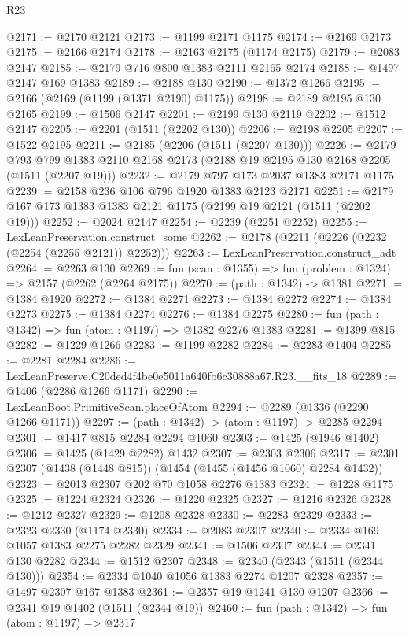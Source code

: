 \begin{lexlean}{R23}
\begin{coremodule}
@2171 := @2170 @2121
@2173 := @1199 @2171 @1175
@2174 := @2169 @2173
@2175 := @2166 @2174
@2178 := @2163 @2175 (@1174 @2175)
@2179 := @2083 @2147
@2185 := @2179 @716 @800 @1383 @2111 @2165 @2174
@2188 := @1497 @2147 @169 @1383
@2189 := @2188 @130
@2190 := @1372 @1266
@2195 := @2166 (@2169 (@1199 (@1371 @2190) @1175))
@2198 := @2189 @2195 @130 @2165
@2199 := @1506 @2147
@2201 := @2199 @130 @2119
@2202 := @1512 @2147
@2205 := @2201 (@1511 (@2202 @130))
@2206 := @2198 @2205
@2207 := @1522 @2195
@2211 := @2185 (@2206 (@1511 (@2207 @130)))
@2226 := @2179
    @793
    @799
    @1383
    @2110
    @2168
    @2173
    (@2188 @19 @2195 @130 @2168 @2205 (@1511 (@2207 @19)))
@2232 := @2179 @797 @173 @2037 @1383 @2171 @1175
@2239 := @2158 @236 @106 @796 @1920 @1383 @2123 @2171
@2251 := @2179 @167 @173 @1383 @1383 @2121 @1175 (@2199 @19 @2121 (@1511 (@2202 @19)))
@2252 := @2024 @2147
@2254 := @2239 (@2251 @2252)
@2255 := LexLeanPreservation.construct_some
@2262 := @2178 (@2211 (@2226 (@2232 (@2254 (@2255 @2121)) @2252)))
@2263 := LexLeanPreservation.construct_adt
@2264 := @2263 @130
@2269 := fun (scan : @1355) => fun (problem : @1324) => @2157 (@2262 (@2264 @2175))
@2270 := (path : @1342) -> @1381
@2271 := @1384 @1920
@2272 := @1384 @2271
@2273 := @1384 @2272
@2274 := @1384 @2273
@2275 := @1384 @2274
@2276 := @1384 @2275
@2280 := fun (path : @1342) => fun (atom : @1197) => @1382 @2276 @1383
@2281 := @1399 @815
@2282 := @1229 @1266
@2283 := @1199 @2282
@2284 := @2283 @1404
@2285 := @2281 @2284
@2286 := LexLeanPreserve.C20ded4f4be0e5011a640fb6c30888a67.R23.__fits_18
@2289 := @1406 (@2286 @1266 @1171)
@2290 := LexLeanBoot.PrimitiveScan.placeOfAtom
@2294 := @2289 (@1336 (@2290 @1266 @1171))
@2297 := (path : @1342) -> (atom : @1197) -> @2285 @2294
@2301 := @1417 @815 @2284 @2294 @1060
@2303 := @1425 (@1946 @1402)
@2306 := @1425 (@1429 @2282) @1432
@2307 := @2303 @2306
@2317 := @2301 @2307 (@1438 (@1448 @815)) (@1454 (@1455 (@1456 @1060) @2284 @1432))
@2323 := @2013 @2307 @202 @70 @1058 @2276 @1383
@2324 := @1228 @1175
@2325 := @1224 @2324
@2326 := @1220 @2325
@2327 := @1216 @2326
@2328 := @1212 @2327
@2329 := @1208 @2328
@2330 := @2283 @2329
@2333 := @2323 @2330 (@1174 @2330)
@2334 := @2083 @2307
@2340 := @2334 @169 @1057 @1383 @2275 @2282 @2329
@2341 := @1506 @2307
@2343 := @2341 @130 @2282
@2344 := @1512 @2307
@2348 := @2340 (@2343 (@1511 (@2344 @130)))
@2354 := @2334 @1040 @1056 @1383 @2274 @1207 @2328
@2357 := @1497 @2307 @167 @1383
@2361 := @2357 @19 @1241 @130 @1207
@2366 := @2341 @19 @1402 (@1511 (@2344 @19))
@2460 := fun (path : @1342) =>
  fun (atom : @1197) =>
  @2317

\end{coremodule}
\end{lexlean}
